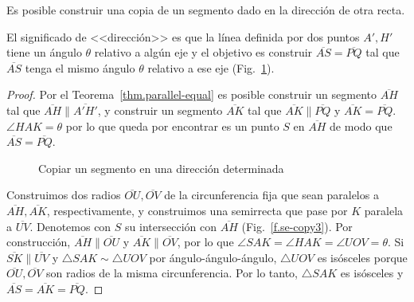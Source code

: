 \begin{theorem}\label{thm.straight-direction}
Es posible construir una copia de un segmento dado en la dirección de otra recta.
\end{theorem}

El significado de <<dirección>> es que la línea definida por dos puntos $A',H'$ tiene un ángulo $\theta$ relativo a algún eje y el objetivo es construir $\overline{AS}=\overline{PQ}$ tal que $\overline{AS}$ tenga el mismo ángulo $\theta$ relativo a ese eje (Fig.~\ref{f.se-copy1}).
\begin{proof}
Por el Teorema~\ref{thm.parallel-equal} es posible construir un segmento $\overline{AH}$ tal que $\overline{AH}\parallel\overline{A'H'}$, y construir un segmento $\overline{AK}$ tal que $\overline{AK}\parallel\overline{PQ}$ y $\overline{AK}=\overline{PQ}$.
$\angle HAK=\theta$ por lo que queda por encontrar es un punto $S$ en $\overline{AH}$ de modo que $\overline{AS}=\overline{PQ}$.

\begin{figure}%
\begin{center}
\end{center}
\caption{Copiar un segmento en una dirección determinada}\label{f.se-copy1}
\end{figure}

Construimos dos radios $\overline{OU}, \overline{OV}$ de la circunferencia fija que sean paralelos a $\overline{AH}, \overline{AK}$, respectivamente, y construimos una semirrecta que pase por $K$ paralela a $\overline{UV}$. Denotemos con $S$ su intersección con $\overline{AH}$ (Fig.~\ref{f.se-copy3}). Por construcción, $\overline{AH}\parallel\overline{OU}$ y $\overline{AK}\parallel\overline{OV}$, por lo que $\angle SAK=\angle HAK=\angle UOV=\theta$. Si $\overline{SK}\parallel\overline{UV}$ y $\triangle SAK\sim\triangle UOV$ por ángulo-ángulo-ángulo, $\triangle UOV$ es isósceles porque $\overline{OU}, \overline{OV}$ son radios de la misma circunferencia. Por lo tanto, $\triangle SAK$ es isósceles y $\overline{AS}=\overline{AK}=\overline{PQ}$.
\end{proof}

